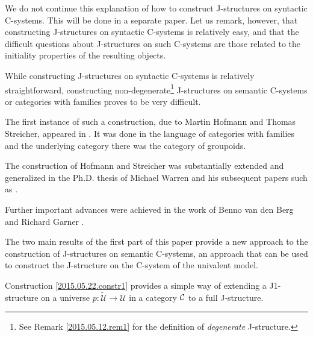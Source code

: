\documentclass[12pt]{article}
\numberwithin{equation}{section}
\newcommand{\comment}[1]{}
\newcommand{\sr}{\rightarrow}
\newcommand{\wt}{\widetilde}
\newcommand{\U}{\mathcal{U}}
\begin{document}
We do not continue this explanation of how to construct J-structures on
syntactic C-systems. This will be done in a separate paper. Let us remark,
however, that constructing J-structures on syntactic C-systems is relatively
easy, and that the difficult questions about J-structures on such C-systems are
those related to the initiality properties of the resulting objects.

While constructing J-structures on syntactic C-systems is relatively
straightforward, constructing non-degenerate\footnote{See Remark
  \ref{2015.05.12.rem1} for the definition of \emph{degenerate} J-structure.} J-structures on semantic C-systems or categories with
families proves to be very difficult.

The first instance of such a construction, due to Martin Hofmann and Thomas
Streicher, appeared in \cite{Hofmann1}. It was done in the language of
categories with families and the underlying category there was the category of
groupoids.

The construction of Hofmann and Streicher was substantially extended and
generalized in the Ph.D.{} thesis of Michael Warren
\cite{WarrenThesisProsp,WarrenThesis} and his subsequent papers such as
\cite{Warreninfty}.

Further important advances were achieved in the work of Benno van den Berg and Richard Garner \cite{BergandGarner}.

\comment{However, the original expectation that it should be possible to
  construct C-systems or categories with families with J-structures
  corresponding to all Quillen closed model categories with sufficiently good
  properties have not been realized. In particular none of the previous methods
  provided a construction of a C-system whose underlying category is the
  category of simplicial sets and whose J-structure corresponds, in an
  appropriately defined sense, to the standard closed model structure on this
  category.

This goal is still not fully realized in this paper, since to achieve it one has
to construct a Kan fibration with certain properties and discussing such a
construction is outside of the scope of this paper. }

The two main results of the first part of this paper provide a new approach to the
construction of J-structures on semantic C-systems, an approach that can be
used to construct the J-structure on the C-system of the univalent model.

Construction \ref{2015.05.22.constr1} provides a simple way of extending a
J1-structure on a universe $p:\wt{\U}\sr \U$ in a category $\cal C$ to a full J-structure.
\end{document}
